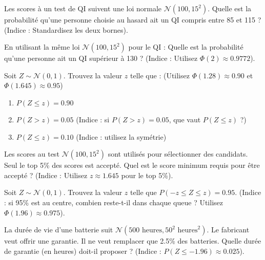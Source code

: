 \begin{exercicebox}
Les scores à un test de QI suivent une loi normale $\mathcal{N}(100, 15^2)$.
Quelle est la probabilité qu'une personne choisie au hasard ait un QI compris entre 85 et 115 ?
(Indice : Standardisez les deux bornes).
\end{exercicebox}

\begin{exercicebox}
En utilisant la même loi $\mathcal{N}(100, 15^2)$ pour le QI :
Quelle est la probabilité qu'une personne ait un QI supérieur à 130 ?
(Indice : Utilisez $\Phi(2) \approx 0.9772$).
\end{exercicebox}


\begin{exercicebox}
Soit $Z \sim \mathcal{N}(0, 1)$. Trouvez la valeur $z$ telle que :
(Utilisez $\Phi(1.28) \approx 0.90$ et $\Phi(1.645) \approx 0.95$)
\begin{enumerate}
    \item $P(Z \le z) = 0.90$
    \item $P(Z > z) = 0.05$ (Indice : si $P(Z>z)=0.05$, que vaut $P(Z \le z)$ ?)
    \item $P(Z \le z) = 0.10$ (Indice : utilisez la symétrie)
\end{enumerate}
\end{exercicebox}

\begin{exercicebox}
Les scores au test $\mathcal{N}(100, 15^2)$ sont utilisés pour sélectionner des candidats. Seul le top 5\% des scores est accepté.
Quel est le score minimum requis pour être accepté ?
(Indice : Utilisez $z \approx 1.645$ pour le top 5\%).
\end{exercicebox}

\begin{exercicebox}
Soit $Z \sim \mathcal{N}(0, 1)$. Trouvez la valeur $z$ telle que $P(-z \le Z \le z) = 0.95$.
(Indice : si 95\% est au centre, combien reste-t-il dans chaque queue ? Utilisez $\Phi(1.96) \approx 0.975$).
\end{exercicebox}

\begin{exercicebox}
La durée de vie d'une batterie suit $\mathcal{N}(500 \text{ heures}, 50^2 \text{ heures}^2)$.
Le fabricant veut offrir une garantie. Il ne veut remplacer que 2.5\% des batteries.
Quelle durée de garantie (en heures) doit-il proposer ?
(Indice : $P(Z \le -1.96) \approx 0.025$).
\end{exercicebox}


